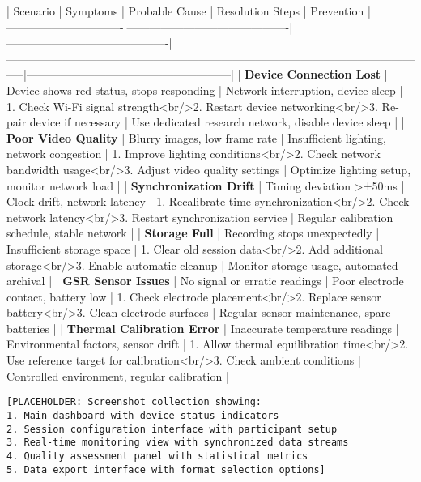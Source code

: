 \documentclass[12pt,a4paper]{article}
\begin{document}
| Scenario                      | Symptoms                                  | Probable Cause                            | Resolution Steps                                                                                                | Prevention                                           |
|-------------------------------|-------------------------------------------|-------------------------------------------|-----------------------------------------------------------------------------------------------------------------|------------------------------------------------------|
| \textbf{Device Connection Lost}    | Device shows red status, stops responding | Network interruption, device sleep        | 1. Check Wi-Fi signal strength<br/>2. Restart device networking<br/>3. Re-pair device if necessary              | Use dedicated research network, disable device sleep |
| \textbf{Poor Video Quality}        | Blurry images, low frame rate             | Insufficient lighting, network congestion | 1. Improve lighting conditions<br/>2. Check network bandwidth usage<br/>3. Adjust video quality settings        | Optimize lighting setup, monitor network load        |
| \textbf{Synchronization Drift}     | Timing deviation >±50ms                   | Clock drift, network latency              | 1. Recalibrate time synchronization<br/>2. Check network latency<br/>3. Restart synchronization service         | Regular calibration schedule, stable network         |
| \textbf{Storage Full}              | Recording stops unexpectedly              | Insufficient storage space                | 1. Clear old session data<br/>2. Add additional storage<br/>3. Enable automatic cleanup                         | Monitor storage usage, automated archival            |
| \textbf{GSR Sensor Issues}         | No signal or erratic readings             | Poor electrode contact, battery low       | 1. Check electrode placement<br/>2. Replace sensor battery<br/>3. Clean electrode surfaces                      | Regular sensor maintenance, spare batteries          |
| \textbf{Thermal Calibration Error} | Inaccurate temperature readings           | Environmental factors, sensor drift       | 1. Allow thermal equilibration time<br/>2. Use reference target for calibration<br/>3. Check ambient conditions | Controlled environment, regular calibration          |

\begin{verbatim}
[PLACEHOLDER: Screenshot collection showing:
1. Main dashboard with device status indicators
2. Session configuration interface with participant setup
3. Real-time monitoring view with synchronized data streams
4. Quality assessment panel with statistical metrics
5. Data export interface with format selection options]
\end{verbatim}
\end{document}
